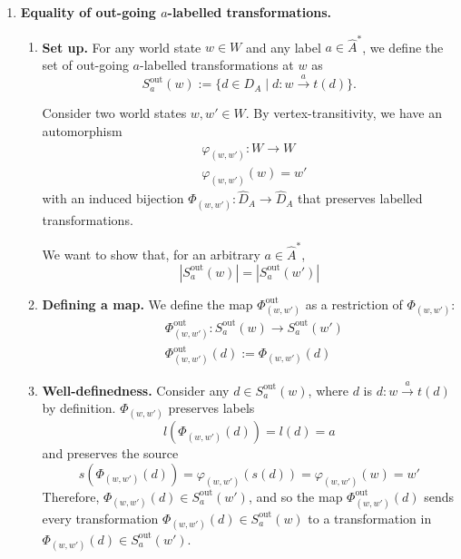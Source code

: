 \begin{proofE}
\begin{enumerate}[(1)]
    \item \textbf{Equality of out-going $a$-labelled transformations.}
    \begin{enumerate}
        \item \textbf{Set up.}
        For any world state $w \in W$ and any label $a \in \hat{A}^{*}$, we define the set of out-going $a$-labelled transformations at $w$ as
        \begin{equation}
            S_{a}^{\text{out}}(w) := \{ d \in D_{A} \mid d: w \xrightarrow{a} t(d) \}.
        \end{equation}

        Consider two world states $w, w' \in W$.
        By vertex-transitivity, we have an automorphism
        \begin{equation}
        \begin{aligned}
            & \varphi_{(w,w')}: W \to W \\
            & \varphi_{(w,w')}(w) = w'
        \end{aligned}
        \end{equation}
        with an induced bijection $\Phi_{(w, w')}: \hat{D}_{A} \to \hat{D}_{A}$ that preserves labelled transformations.

        We want to show that, for an arbitrary $a \in \hat{A}^{*}$,
        \begin{equation}
            |S_{a}^{\text{out}}(w)| = |S_{a}^{\text{out}}(w')|
        \end{equation}

        \item \textbf{Defining a map.}
        We define the map $\Phi_{(w, w')}^{\text{out}}$ as a restriction of $\Phi_{(w, w')}$:
        \begin{equation}
        \begin{aligned}
            & \Phi_{(w, w')}^{\text{out}}: S_{a}^{\text{out}}(w) \to S_{a}^{\text{out}}(w') \\
            & \Phi_{(w, w')}^{\text{out}}(d) := \Phi_{(w, w')}(d)
        \end{aligned}
        \end{equation}

        \item \textbf{Well-definedness.}
        Consider any $d \in S_{a}^{\text{out}}(w)$, where $d$ is $d: w \xrightarrow{a} t(d)$ by definition.
        $\Phi_{(w, w')}$ preserves labels
        \begin{equation}
            l(\Phi_{(w, w')}(d)) = l(d) = a
        \end{equation}
        and preserves the source
        \begin{equation}
            s(\Phi_{(w, w')}(d)) = \varphi_{(w, w')}(s(d)) = \varphi_{(w, w')}(w) = w'
        \end{equation}
        Therefore, $\Phi_{(w, w')}(d) \in S_{a}^{\text{out}}(w')$, and so the map $\Phi_{(w, w')}^{\text{out}}(d)$ sends every transformation $\Phi_{(w, w')}(d) \in S_{a}^{\text{out}}(w)$ to a transformation in $\Phi_{(w, w')}(d) \in S_{a}^{\text{out}}(w')$.


\end{enumerate}
\end{enumerate}
\end{proofE}
